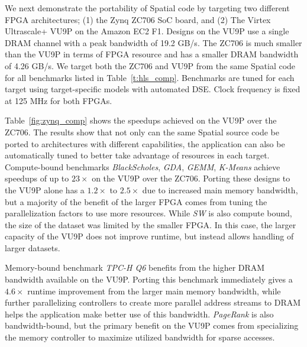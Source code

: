 We next demonstrate the portability of Spatial code by targeting two different FPGA architectures; (1) the Zynq ZC706 SoC board, and (2) The Virtex Ultrascale+ VU9P on the Amazon EC2 F1.
Designs on the VU9P use a single DRAM channel with a peak bandwidth of 19.2 GB/s. The ZC706 is much smaller than the VU9P in terms of FPGA resource and has a smaller DRAM bandwidth of 4.26 GB/s.
We target both the ZC706 and VU9P from the same Spatial code for all benchmarks listed in Table~\ref{t:hls_comp}. Benchmarks are tuned for each target using
target-specific models with automated DSE. Clock frequency is fixed at 125 MHz for both FPGAs.

Table~\ref{fig:zynq_comp} shows the speedups achieved on the VU9P over the ZC706. The results show that not only can the same Spatial source code be ported
to architectures with different capabilities, the application can also be automatically tuned to better take advantage of resources in each target.
Compute-bound benchmarks \emph{BlackScholes}, \emph{GDA}, \emph{GEMM}, \emph{K-Means} achieve speedups of up to $23\times$ on the VU9P over the ZC706. Porting these designs to the VU9P alone has a $1.2\times$ to $2.5\times$ due to increased main memory bandwidth, but a majority of the benefit of the larger FPGA comes from tuning the parallelization factors to use more resources.
While \emph{SW} is also compute bound, the size of the dataset was limited by the smaller FPGA. In this case, the larger capacity of the VU9P does not improve runtime, but instead allows handling of larger datasets.

Memory-bound benchmark \emph{TPC-H Q6} benefits from the higher DRAM bandwidth available on the VU9P. Porting this benchmark immediately gives a $4.6\times$ runtime improvement from the larger main memory bandwidth, while further parallelizing controllers to create more parallel address streams to DRAM helps the application make better use of this bandwidth. \emph{PageRank} is also bandwidth-bound, but the primary benefit on the VU9P comes from specializing the memory controller to maximize utilized bandwidth for sparse accesses.







